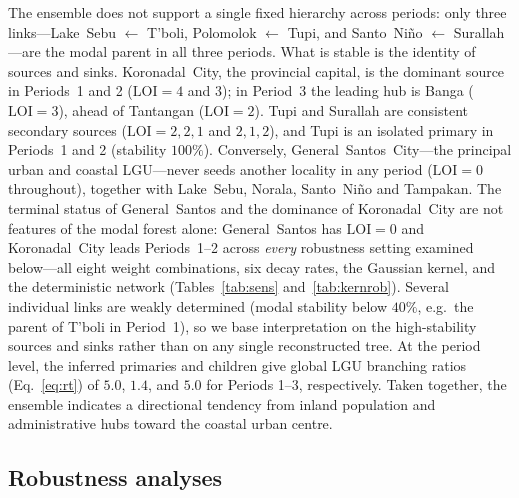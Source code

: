 \documentclass[a4paper,11pt]{article}
\begin{document}
The ensemble does not support a single fixed hierarchy across periods: only three
links---Lake~Sebu $\leftarrow$ T'boli, Polomolok $\leftarrow$ Tupi, and
Santo~Ni\~{n}o $\leftarrow$ Surallah---are the modal parent in all three periods.
What is stable is the identity of sources and sinks. Koronadal~City, the provincial
capital, is the dominant source in Periods~1 and 2 ($\mathrm{LOI}=4$ and $3$); in Period~3
the leading hub is Banga ($\mathrm{LOI}=3$), ahead of Tantangan ($\mathrm{LOI}=2$). Tupi and
Surallah are consistent secondary sources ($\mathrm{LOI}=2,2,1$ and $2,1,2$), and Tupi is an
isolated primary in Periods~1 and 2 (stability $100\%$). Conversely,
General~Santos~City---the principal urban and coastal LGU---never seeds another
locality in any period ($\mathrm{LOI}=0$ throughout), together with Lake~Sebu, Norala,
Santo~Ni\~{n}o and Tampakan. The terminal status of General~Santos and the dominance
of Koronadal~City are not features of the modal forest alone: General~Santos has
$\mathrm{LOI}=0$ and Koronadal~City leads Periods~1--2 across \emph{every} robustness setting
examined below---all eight weight combinations, six decay rates, the Gaussian kernel,
and the deterministic network (Tables~\ref{tab:sens} and~\ref{tab:kernrob}). Several
individual links are weakly determined (modal stability below $40\%$, e.g.\ the parent
of T'boli in Period~1), so we base interpretation on the high-stability sources and
sinks rather than on any single reconstructed tree. At the period level, the inferred
primaries and children give global LGU branching ratios (Eq.~\ref{eq:rt}) of $5.0$,
$1.4$, and $5.0$ for Periods 1--3, respectively. Taken together, the ensemble indicates a
directional tendency from inland population and administrative hubs toward the
coastal urban centre.


\subsection{Robustness analyses}
\label{sec:sens}
\end{document}
